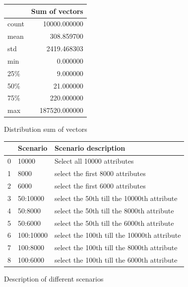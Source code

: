 \documentclass[11pt]{article}
\begin{document}
\begin{figure}
\begin{minipage}[t]{0.3\textwidth}
\begin{tabular}{lr}
\toprule
{} &	Sum of vectors \\
\midrule
count &   10000.000000 \\
mean  &     308.859700 \\
std   &    2419.468303 \\
min   &       0.000000 \\
25\%   &       9.000000 \\
50\%   &      21.000000 \\
75\%   &     220.000000 \\
max   &  187520.000000 \\
\bottomrule
\end{tabular}
\caption{Distribution sum of vectors}
\label{Fig::Distribution sum of vectors}
\end{minipage}
%
\begin{minipage}[t]{0.6\textwidth}
\begin{tabular}{lll}
\toprule
{} &   Scenario &  Scenario description \\
\midrule
0 &      10000 & Select all 10000 attributes   \\
1 &       8000 & select the first 8000 attributes  \\
2 &       6000 & select the first 6000 attributes   \\
3 &   50:10000 & select the 50th till the 10000th attribute   \\
4 &    50:8000 & select the 50th till the 8000th attribute    \\
5 &    50:6000 & select the 50th till the 6000th attribute    \\
6 &  100:10000 & select the 100th till the 10000th attribute    \\
7 &   100:8000 & select the 100th till the 8000th attribute    \\
8 &   100:6000 & select the 100th till the 6000th attribute	\\ 
\bottomrule
\end{tabular}
\caption{Description of different scenarios}
\label{Fig::Descriptioon of scenarios}
\end{minipage}
\end{figure}
%
\end{document}
